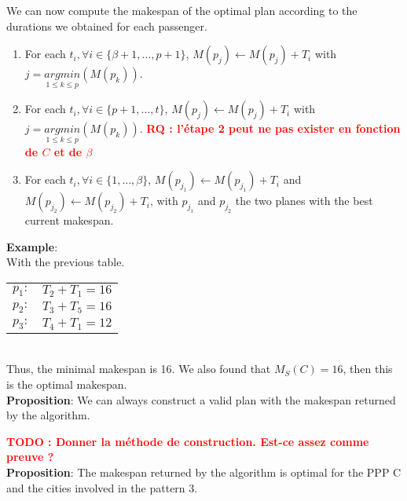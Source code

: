 \documentclass[a4paper,11pt]{article}
\newcommand{\myred}[1]
{\textcolor{red}{\bf {#1}}
}
\begin{document}
We can now compute the makespan of the optimal plan according to the durations we obtained for each passenger.\\
\begin{enumerate}
\item For each $t_i, \forall i\in\{\beta+1,\ldots, p+1\}$, $M(p_j) \leftarrow M(p_j) + T_i$ with $j = \underset{1 \leq k \leq p}{argmin}(M(p_k))$.
\item For each $t_i, \forall i\in\{p+1,\ldots, t\}$, $M(p_j) \leftarrow M(p_j) + T_i$ with $j = \underset{1 \leq k \leq p}{argmin}(M(p_k))$. \myred{RQ : l'étape 2 peut ne pas exister en fonction de $C$ et de $\beta$}
\item For each $t_i, \forall i\in\{1,\ldots, \beta\}$, $M(p_{j_1}) \leftarrow M(p_{j_1}) + T_i$ and $M(p_{j_2}) \leftarrow M(p_{j_2}) + T_i$, with $p_{j_1}$ and $p_{j_2}$ the two planes with the best current makespan.
\end{enumerate}

\noindent
{\bf Example}: \\

\noindent
With the previous table.\\

\begin{tabular}{c l }
    $p_1:$ & $T_2+T_1=16$ \tabularnewline
    $p_2:$ & $T_3+T_5=16$ \tabularnewline
    $p_3:$ & $T_4+T_1=12$ \tabularnewline
\end{tabular}

~\\ Thus, the minimal makespan is 16. We also found that $M_S(C)=16$, then this is the optimal makespan.\\

\noindent
{\bf Proposition}: We can always construct a valid plan with the makespan returned by the algorithm.

\myred{TODO : Donner la méthode de construction. Est-ce assez comme preuve ?}\\

\noindent
{\bf Proposition}: The makespan returned by the algorithm is optimal for the PPP C and the cities involved in the pattern 3.\\
\end{document}
